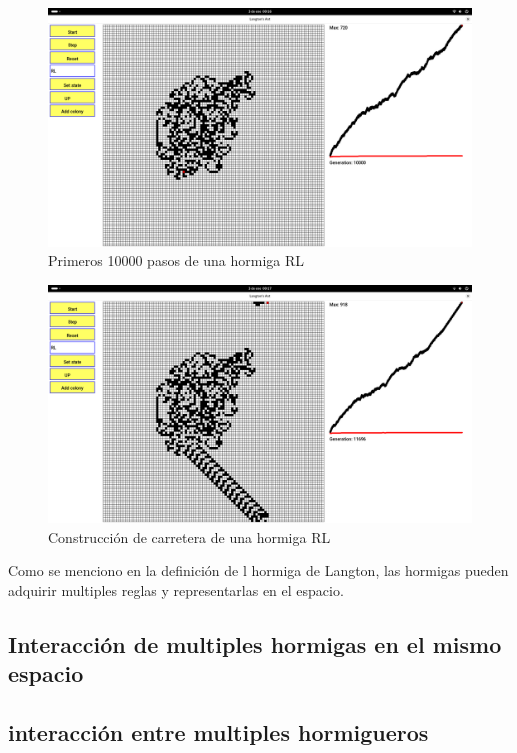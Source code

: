\documentclass[12pt,twoside]{article}
\begin{document}
	\begin{figure}[H]
		\centering
		\includegraphics[width=\textwidth]{img/rl1.png}
		\caption{Primeros 10000 pasos de una hormiga RL}
		\label{img:rl1}
	\end{figure}
	
	\begin{figure}[H]
		\centering
		\includegraphics[width=\textwidth]{img/rl2.png}
		\caption{Construcción de carretera de una hormiga RL}
		\label{img:rl2}
	\end{figure}
	
	Como se menciono en la definición de l hormiga de Langton, las hormigas pueden adquirir multiples reglas y representarlas en el espacio.
	
	\subsection{Interacción de multiples hormigas en el mismo espacio}
	
	\subsection{interacción entre multiples hormigueros}
	

	\clearpage
	\begin{thebibliography}{99}
		\bibitem{}
		
	\end{thebibliography}
	
\end{document}
